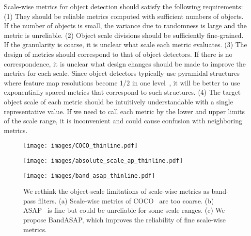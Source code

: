 \documentclass{mva_style}
\begin{document}
Scale-wise metrics for object detection should satisfy the following requirements:
(1) They should be reliable metrics computed with sufficient numbers of objects.
If the number of objects is small, the variance due to randomness is large and the metric is unreliable.
(2) Object scale divisions should be sufficiently fine-grained.
If the granularity is coarse, it is unclear what scale each metric evaluates.
(3) The design of metrics should correspond to that of object detectors.
If there is no correspondence, it is unclear what design changes should be made to improve the metrics for each scale.
Since object detectors typically use pyramidal structures where feature map resolutions become 1/2 in one level~\cite{SSD_ECCV2016, FPN_CVPR2017}, it will be better to use exponentially-spaced metrics that correspond to such structures.
(4) The target object scale of each metric should be intuitively understandable with a single representative value.
If we need to call each metric by the lower and upper limits of the scale range,
it is inconvenient and could cause confusion with neighboring metrics.




\begin{figure}[H]
	\begin{minipage}[t]{\linewidth}
		\centering
		\texttt{[image: images/COCO\_thinline.pdf]}
		\vspace{-5.7mm}
	\end{minipage}
	\begin{minipage}[t]{\linewidth}
		\centering
		\vspace{3mm}
		\texttt{[image: images/absolute\_scale\_ap\_thinline.pdf]}
		\vspace{-5.7mm}
	\end{minipage}
	\begin{minipage}[t]{\linewidth}
		\centering
		\vspace{3mm}
		\texttt{[image: images/band\_asap\_thinline.pdf]}
		\vspace{-5.7mm}
	\end{minipage}
	\vspace{3mm}
	\caption{
		We rethink the object-scale limitations of scale-wise metrics as band-pass filters.
		(a) Scale-wise metrics of COCO~\cite{COCO_ECCV2014, cocoapi} are too coarse.
		(b) ASAP~\cite{USB_Shinya_BMVC2022} is fine but could be unreliable for some scale ranges.
		(c) We propose BandASAP, which improves the reliability of fine scale-wise metrics.
	}
	\label{fig:filter_bank_comparison}
\end{figure}
\end{document}
